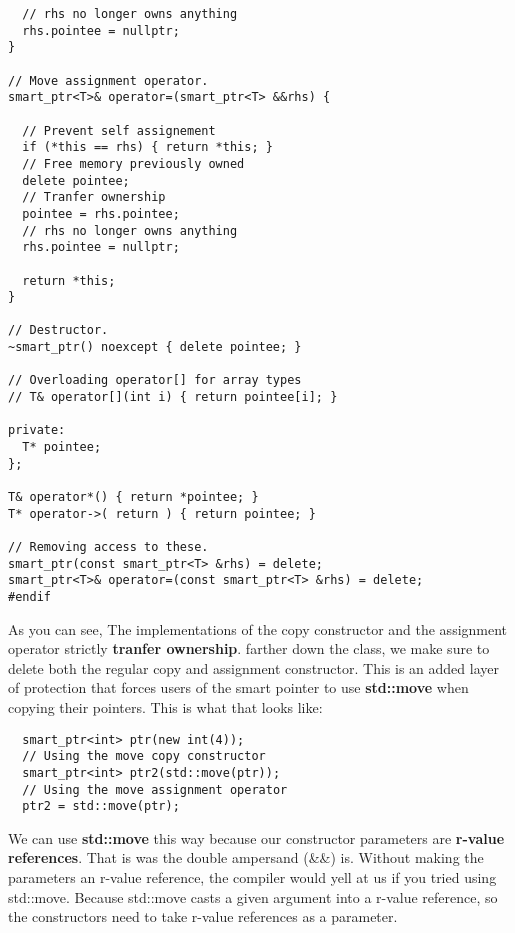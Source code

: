 \documentclass{report}
\begin{document}
{\begin{verbatim}
  // rhs no longer owns anything
  rhs.pointee = nullptr;
}

// Move assignment operator.
smart_ptr<T>& operator=(smart_ptr<T> &&rhs) {

  // Prevent self assignement
  if (*this == rhs) { return *this; }
  // Free memory previously owned 
  delete pointee;
  // Tranfer ownership
  pointee = rhs.pointee; 
  // rhs no longer owns anything
  rhs.pointee = nullptr;
  
  return *this;
}

// Destructor.
~smart_ptr() noexcept { delete pointee; }

// Overloading operator[] for array types
// T& operator[](int i) { return pointee[i]; }

private:
  T* pointee;
};

T& operator*() { return *pointee; }
T* operator->( return ) { return pointee; }

// Removing access to these. 
smart_ptr(const smart_ptr<T> &rhs) = delete;
smart_ptr<T>& operator=(const smart_ptr<T> &rhs) = delete;
#endif 
\end{verbatim}


}
\bigbreak \noindent
\noindent As you can see, The implementations of the copy constructor and the assignment operator strictly \textbf{tranfer ownership}. farther down the class, we make sure to delete both the regular copy and assignment constructor. This is an added layer of protection that forces users of the smart pointer to use \textbf{std::move} when copying their pointers. This is what that looks like:

\begin{verbatim}
  smart_ptr<int> ptr(new int(4));
  // Using the move copy constructor
  smart_ptr<int> ptr2(std::move(ptr));
  // Using the move assignment operator
  ptr2 = std::move(ptr);
\end{verbatim}
\bigbreak \noindent
We can use \textbf{std::move} this way because our constructor parameters are \textbf{r-value references}. That is was the double ampersand (\&\&) is. Without making the parameters an r-value reference, the compiler would yell at us if you tried using std::move. Because std::move casts a given argument into a r-value reference, so the constructors need to take r-value references as a parameter.
\end{document}
